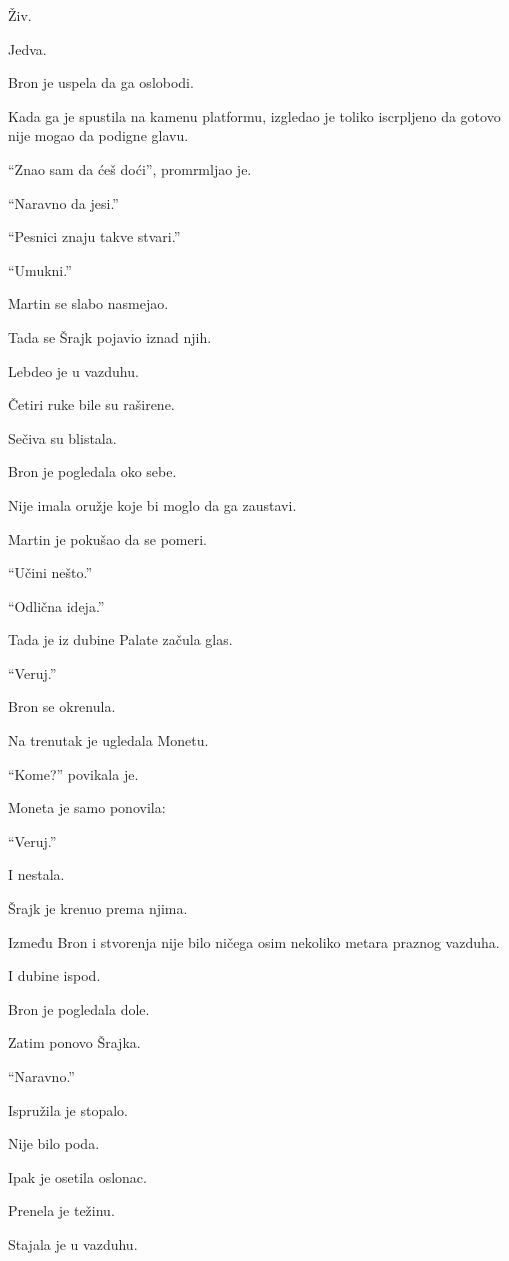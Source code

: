 Živ.

Jedva.

Bron je uspela da ga oslobodi.

Kada ga je spustila na kamenu platformu, izgledao je toliko iscrpljeno da gotovo nije mogao da podigne glavu.

``Znao sam da ćeš doći'', promrmljao je.

``Naravno da jesi.''

``Pesnici znaju takve stvari.''

``Umukni.''

Martin se slabo nasmejao.

\bigskip

Tada se Šrajk pojavio iznad njih.

Lebdeo je u vazduhu.

Četiri ruke bile su raširene.

Sečiva su blistala.

Bron je pogledala oko sebe.

Nije imala oružje koje bi moglo da ga zaustavi.

Martin je pokušao da se pomeri.

``Učini nešto.''

``Odlična ideja.''

Tada je iz dubine Palate začula glas.

``Veruj.''

Bron se okrenula.

Na trenutak je ugledala Monetu.

``Kome?'' povikala je.

Moneta je samo ponovila:

``Veruj.''

I nestala.

\bigskip

Šrajk je krenuo prema njima.

Između Bron i stvorenja nije bilo ničega osim nekoliko metara praznog vazduha.

I dubine ispod.

Bron je pogledala dole.

Zatim ponovo Šrajka.

``Naravno.''

Ispružila je stopalo.

Nije bilo poda.

Ipak je osetila oslonac.

Prenela je težinu.

Stajala je u vazduhu.

